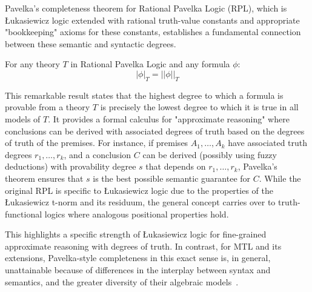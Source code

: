 Pavelka's completeness theorem for Rational Pavelka Logic (RPL), which is Łukasiewicz logic extended with rational truth-value constants and appropriate "bookkeeping" axioms for these constants, establishes a fundamental connection between these semantic and syntactic degrees.

\begin{theorem}
For any theory $T$ in Rational Pavelka Logic and any formula $\phi$:
\[
 |\phi|_T = ||\phi||_T 
\]
\end{theorem}

This remarkable result states that the highest degree to which a formula is provable from a theory $T$ is precisely the lowest degree to which it is true in all models of $T$. It provides a formal calculus for "approximate reasoning" where conclusions can be derived with associated degrees of truth based on the degrees of truth of the premises. For instance, if premises $A_1, \ldots, A_k$ have associated truth degrees $r_1, \ldots, r_k$, and a conclusion $C$ can be derived (possibly using fuzzy deductions) with provability degree $s$ that depends on $r_1, \ldots, r_k$, Pavelka's theorem ensures that $s$ is the best possible semantic guarantee for $C$. While the original RPL is specific to Łukasiewicz logic due to the properties of the Łukasiewicz t-norm and its residuum, the general concept carries over to truth-functional logics where analogous positional properties hold.

This highlights a specific strength of Łukasiewicz logic for fine-grained approximate reasoning with degrees of truth. In contrast, for MTL and its extensions, Pavelka-style completeness in this exact sense is, in general, unattainable because of differences in the interplay between syntax and semantics, and the greater diversity of their algebraic models~\cite[Rem. 4.1.22, Rem. 4.2.22]{Hajek1998}.
